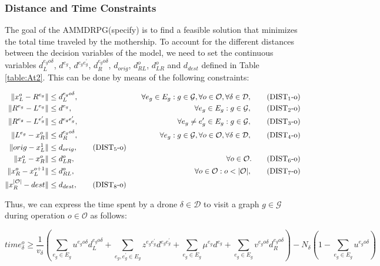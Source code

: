 \documentclass[10pt,a4paper]{elsarticle}
\def\AMD{{\sf AMMDRPG\xspace}}
\begin{document}
			\subsubsection*{Distance and Time Constraints}
			\noindent
			The goal of the \AMD\xspace (specify) is to find a feasible solution that minimizes the total time traveled by the mothership. To account for the different distances between the decision variables of the model, we need to set the continuous variables $d_L^{e_go\delta}$, $d^{e_g}$, $d^{e_ge^\prime_g}$, $d_R^{e_go\delta}$, $d_{orig}$, $d_{RL}^o$, $d_{LR}^o$ and $d_{dest}$ defined in Table \ref{table:At2}. This can be done by means of the following constraints:
			
			
			\begin{align*}
				\|x_L^o- R^{e_g}\| & \leq  d_L^{e_go\delta},  &\quad \forall e_g\in E_g:g\in \mathcal{G}, \forall o\in \mathcal O, \forall \delta\in\mathcal D, \tag{DIST$_{1}$-o} \label{eq:NOd1}\\
				\|R^{e_g}- L^{e_g}\| & \leq  d^{e_g},  &\quad \forall e_g\in E_g:g\in \mathcal{G}, \tag{DIST$_{2}$-o} \label{eq:NOd2}\\
				\|R^{e_g}- L^{e^\prime_g}\| & \leq  d^{e_ge^\prime_g}, &\quad \forall e_g\neq e_g'\in E_g:g\in \mathcal{G}, \tag{DIST$_{3}$-o} \label{eq:NOd3}\\
				\|L^{e_g}- x_R^o\| & \leq  d_R^{e_go\delta}, &\quad \forall e_g:g\in \mathcal{G},\forall o\in \mathcal O, \forall \delta\in\mathcal D, \tag{DIST$_{4}$-o} \label{eq:NOd4}\\
				\|orig - x_L^1\| & \leq d_{orig}, \tag{DIST$_5$-o}\label{eq:NOd5}\\
				\|x_L^o- x_R^o\| & \leq  d_{LR}^o, & \quad \forall o\in \mathcal O. \tag{DIST$_{6}$-o} \label{eq:NOd6}\\
				\|x_R^o- x_L^{o+1}\| & \leq  d_{RL}^o, & \quad \forall o\in \mathcal O:o<|\mathcal O|, \tag{DIST$_{7}$-o} \label{eq:NOd7}\\
				\|x_R^{|\mathcal O|} - dest\| & \leq d_{dest}, \tag{DIST$_8$-o}\label{eq:NOd8}\\
			\end{align*}
			
			\noindent
			Thus, we can express the time spent by a drone $\delta \in \mathcal D$ to visit a graph $g \in \mathcal G$ during operation $o \in \mathcal O$ as follows:
			
			\begin{equation}
				time_\delta^o \geq \frac{1}{v_\delta}\left(\sum_{e_g\in E_g} u^{e_go\delta}d_L^{e_go\delta} + \sum_{e_g, e^\prime_g\in E_g}z^{e_ge^\prime_g}d^{e_ge^\prime_g} + \sum_{e_g\in E_g} \mu^{e_g}d^{e_g} + \sum_{e_g\in E_g} v^{e_go\delta}d_R^{e_go\delta}\right) - N_\delta(1 - \sum_{e_g\in E_g} u^{e_go\delta})
				\label{eq:NOtimed}
			\end{equation}
			
\end{document}
